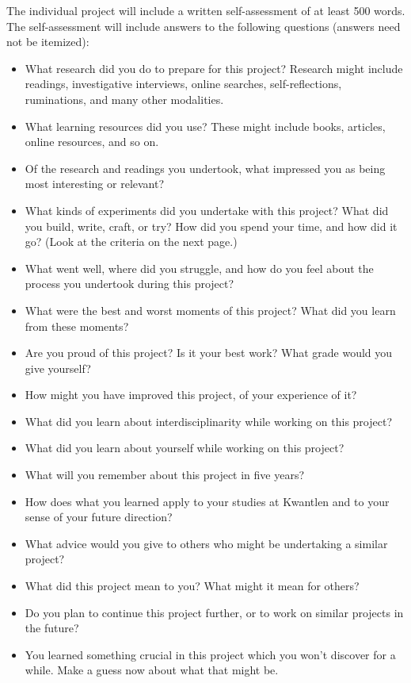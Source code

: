 \documentclass[letterpaper,10pt,headsepline]{scrreprt}
\begin{document}
The individual project will include a written self-assessment of at least 500 words. The self-assessment will include answers to the following questions (answers need not be itemized): 

 \begin{itemize}
\item What research did you do to prepare for this project? Research might include readings, investigative interviews, online searches, self-reflections, ruminations, and many other modalities. 

\item What learning resources did you use? These might include books, articles, online resources, and so on.

\item Of the research and readings you undertook, what impressed you as being most interesting or relevant?

\item What kinds of experiments did you undertake with this project? What did you build, write, craft, or try? How did you spend your time, and how did it go? (Look at the criteria on the next page.)

\item What went well, where did you struggle, and how do you feel about the process you undertook during this project?

\item What were the best and worst moments of this project? What did you learn from these moments?

\item Are you proud of this project? Is it your best work? What grade would you give yourself?

\item How might you have improved this project, of your experience of it?

\item What did you learn about interdisciplinarity while working on this project?

\item What did you learn about yourself while working on this project?

\item What will you remember about this project in five years?

\item How does what you learned apply to your studies at Kwantlen and to your sense of your future direction?

\item What advice would you give to others who might be undertaking a similar project?

\item What did this project mean to you? What might it mean for others?

\item Do you plan to continue this project further, or to work on similar projects in the future?

\item You learned something crucial in this project which you won't discover for a while. Make a guess now about what that might be.

\end{itemize}
\end{document}
